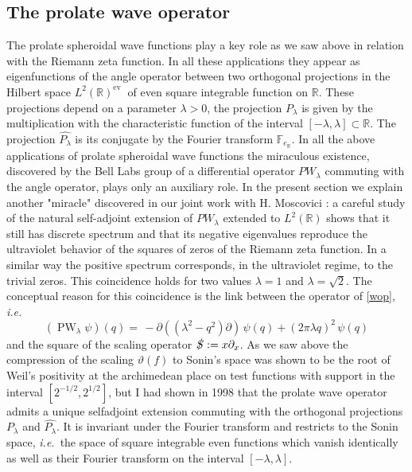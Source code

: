 \documentclass{article}
\newcommand{\ie}{{\it i.e.\/}\ }
\def\pw{\operatorname{PW}}
\begin{document}
\subsection{The prolate wave operator}\label{cmpro}
The prolate spheroidal wave functions play a key role as we saw above in relation with the Riemann zeta function. In all these applications they appear as eigenfunctions of the angle operator between two orthogonal projections in the Hilbert space $L^2(\mathbb{R})^{\text {ev }}$ of even square integrable function on $\mathbb{R}$. These projections depend on a parameter $\lambda>0$, the projection $P_\lambda$ is given by the multiplication with the characteristic function of the interval $[-\lambda, \lambda] \subset \mathbb{R}$. The projection $\widehat{P_\lambda}$ is its conjugate by the Fourier transform $\mathbb{F}_{e_{\mathbb{R}}}$.
In all the above applications of prolate spheroidal wave functions the miraculous existence, discovered by the Bell Labs group  of a differential operator $PW_\lambda$ commuting with the angle operator, plays only an auxiliary role. In the present section we explain another "miracle" discovered in our joint work with H. Moscovici \cite{CM}: a careful study of the natural self-adjoint extension of $PW_\lambda$ extended  to $L^2(\mathbb{R})$ shows that it still has discrete spectrum and that its negative eigenvalues reproduce the ultraviolet behavior of the squares of zeros of the Riemann zeta function. In a similar way the positive spectrum corresponds, in the ultraviolet regime, to the trivial zeros. This coincidence holds for two values $\lambda=1$ and $\lambda=\sqrt{2}$. The conceptual reason for this coincidence is the link between the operator of \eqref{wop}, \ie
\begin{equation}
(\pw_{\lambda}\psi)(q) = \,- \partial (( \lambda^2- q^2) \partial )\,
\psi(q) + (2 \pi \lambda  q)^2 \, \psi(q)   \label{WLambdaq1}
\end{equation}
and the square of the scaling operator $\slashed S:=x \partial_x$. As we saw above the compression of the scaling $\vartheta(f)$ to Sonin's space  was shown to be the root of Weil's positivity at the archimedean place on test functions with support in the interval $\left[2^{-1 / 2}, 2^{1 / 2}\right]$, but
 	I had shown in 1998 that the prolate wave operator 
 	admits a unique selfadjoint extension commuting with the orthogonal projections $P_\lambda$ and $\widehat{P_\lambda}$. It is invariant under the Fourier transform and restricts to the Sonin space, \ie the space of square integrable even functions which vanish identically as well as their Fourier transform on the interval $[-\lambda,\lambda]$.
\end{document}
